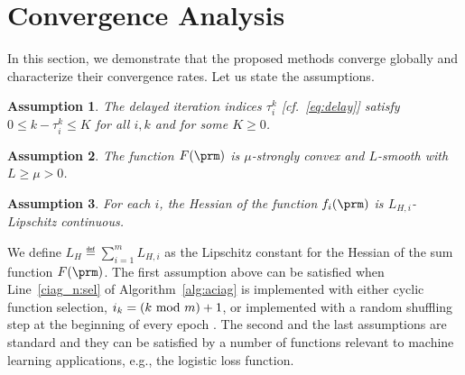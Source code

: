 \documentclass[smallextended]{svjour3}       %
\newtheorem{Assumption}{Assumption}
\begin{document}
\section{Convergence Analysis} \label{sec:ana}
In this section, we demonstrate that the proposed methods converge 
globally and characterize their convergence rates.  
Let us state the assumptions. 
\begin{Assumption} \label{ass:K}
The delayed iteration indices $\tau_i^k$ [cf.~\eqref{eq:delay}] satisfy $0 \leq k - \tau_i^k \leq K$ for all $i,k$ and for some $K \geq 0$.
\end{Assumption} 
\begin{Assumption} \label{ass:F} The function
$F(\prm)$ is $\mu$-strongly convex and $L$-smooth with $L \geq \mu > 0$.
\end{Assumption} 	
\begin{Assumption} \label{ass:fi}
For each $i$, the Hessian of the function $f_i(\prm)$ is $L_{H,i}$-Lipschitz continuous. 
\end{Assumption} 
We define $L_H \eqdef \sum_{i=1}^m L_{H,i}$ as the Lipschitz constant for the 
Hessian of the sum function $F(\prm)$. 
The first assumption above can be satisfied when Line~\ref{ciag_n:sel} of
Algorithm~\ref{alg:aciag} is implemented with either 
cyclic function selection, \ie $i_k = (k~{\rm mod}~m)+1$, or implemented with a random shuffling step
at the beginning of every epoch \cite{gurbuzbalaban2015random}. 
The second and the last assumptions 
are standard and they 
can be satisfied by a number of 
functions relevant to machine learning applications, e.g., the logistic loss function. 
\end{document}
